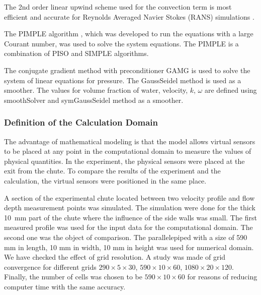 \documentclass[mathematics,article,submit,pdftex,moreauthors]{Definitions/mdpi}
\begin{document}
The 2nd order linear upwind scheme used for the convection term is most efficient and accurate for Reynolds Averaged Navier Stokes (RANS) simulations \cite{ROBERTSON2015122}.

The PIMPLE algorithm \cite{Holzmann2019, Yin2003}, which was developed to run the equations with a large Courant number, was used to solve the system equations. The PIMPLE is a combination of PISO \cite{Issa1986_2} and SIMPLE \cite{Issa1986_1} algorithms.

%

The conjugate gradient method with preconditioner GAMG is used to solve the system of linear equations for pressure. The GaussSeidel method is used as a smoother. The values for volume fraction of water, velocity, $k$, $\omega$ are defined using smoothSolver and  symGaussSeidel method as a smoother. 

\subsubsection{Definition of the Calculation Domain}

The advantage of mathematical modeling is that the model allows virtual sensors to be placed at any point in the computational domain to measure the values of physical quantities. In the experiment, the physical sensors were placed at the exit from the chute. To compare the results of the experiment and the calculation, the virtual sensors were positioned in the same place.

A section of the experimental chute located between two velocity profile and flow depth measurement points was simulated. 
The simulation were done for the thick  10~mm part of the chute where the influence of the side walls was small.
The first measured profile was used for the input data for the computational domain. The second one was the object of comparison. 
%
The parallelepiped with a size of 590 mm in length, 10 mm in width, 10 mm in height was used for numerical domain.
%
We have checked the effect of grid resolution. A study was made of grid convergence for different grids $290 \times 5 \times 30$, $590 \times 10 \times 60$, $1080 \times 20 \times 120$. Finally, the number of cells was chosen to be $590 \times 10 \times 60$ for reasons of reducing computer time with the same accuracy.
\end{document}
